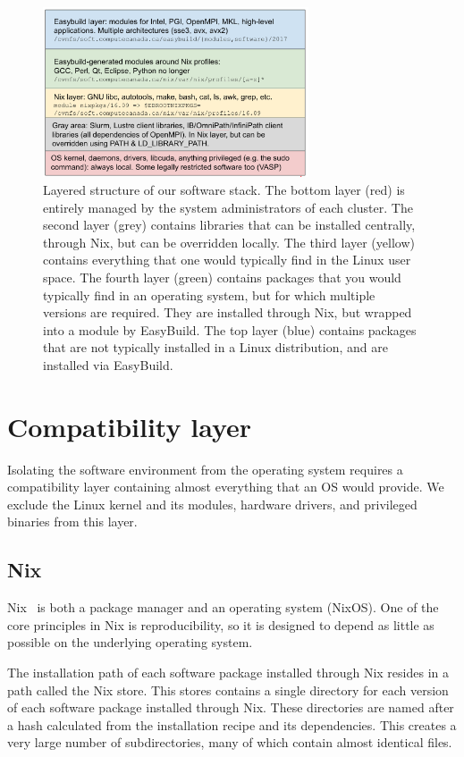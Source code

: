 \documentclass[sigconf]{acmart}
\begin{document}
\begin{figure}
  \includegraphics[width=0.7\textwidth]{layers.png}
  \caption{Layered structure of our software stack. The bottom layer (red) is entirely managed by the system administrators of each cluster. The second layer (grey) contains libraries that can be installed centrally, through Nix, but can be overridden locally. The third layer (yellow) contains everything that one would typically find in the Linux user space. The fourth layer (green) contains packages that you would typically find in an operating system, but for which multiple versions are required. They are installed through Nix, but wrapped into a module by EasyBuild. The top layer (blue) contains packages that are not typically installed in a Linux distribution, and are installed via EasyBuild.}
  \label{fig:layers}
\end{figure}

\section{Compatibility layer}
\label{sec:Compatibility_layer}
Isolating the software environment from the operating system requires a compatibility layer containing almost everything that an OS would provide. We exclude the Linux kernel and its modules, hardware drivers, and privileged binaries from this layer.

\subsection{Nix}
\label{sub:Nix}
Nix~\cite{Nix} is both a package manager and an operating system (NixOS). One of the core principles in Nix is reproducibility, so it is designed to depend as little as possible on the underlying operating system. 

The installation path of each software package installed through Nix resides in a path called the Nix store. This stores contains a single directory for each version of each software package installed through Nix. These directories are named after a hash calculated from the installation recipe and its dependencies. This creates a very large number of subdirectories, many of which contain almost identical files. 
\end{document}
